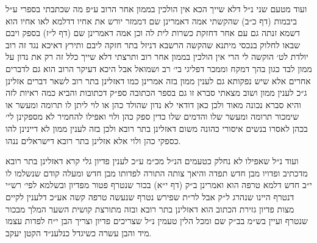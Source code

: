 \documentclass[12pt, openany]{book}
\begin{document}
\begin{multicols}{2}
ועוד מטעם שני נ״ל דלא שייך הכא אין הולכין בממון אחר הרוב ע״פ מה שכתבתי בספרי ע״ל ביבמות (דף כ״ב) שהקשתי אמה דאמרינן שם דממזר יורש את אחיו דדלמא לאו אחיו הוא דשמא זנתה גם עם אחר דחזקת כשרות לית לה וכן אמה דאמרינן שם (דף ל״ז) בספק ויבם שבאו לחלוק בנכסי מיתנא שהקשה הרשבא דניזל בתר חזקה ליבם ותירץ דאיכא נגד זה רוב יולדת לט׳ הוקשה לי הרי אין הולכין בממון אחר רוב ותרצתי דלא שייך כלל זה רק את נדון על ממון לבד כגון בהך דמקח וממכר דפליגי בי׳ רב ושמואל אבל היכא דעיקר הרוב הוא גם לדברים אחרים אלא שיש נפקותא גם לענין ממון בזה אמרינן כמו דאזלינן בתר רוב לשאר דברים אזלינן ג״כ לענין ממון ושוב מצאתי סברא זו גם בספר הכתובה ספ״ק דכתובות והביא כמה ראיות לזה והיא סברא נכונה מאוד ולכן כאן דודאי לא נדון שהולד כהן או לוי ליתן לו תרומה ומעשר או שימכור תרומה ומעשר שלו והדמים שלו כדין ספק כהן ולוי ואפילו להחמיר לא מספקינן לי׳ בכהן לאסרו בנשים איסורי כהונה משום דאזלינן בתר רובא ולכן בזה לענין ממון לא דיינינן להו כספקי כהן ולוי אלא אזלינן בתר רובא דישראלים ננהו.\\\vspace{0pt}

ועוד נ״ל שאפילו לא נחלק כטעמים הנ״ל מכ״מ ע״כ לענין פדיון גלי קרא דאזלינן בתר רובא מדכתיב ופדויו מבן חדש תפדה והיאך צותה התורה לפדותו מבן חדש ומעלה קודם שנשלמו לו י״ב חדש דלמא טרפה הוא ואמרינן ב״ק (דף י״א) בכור שנטרף פטור מפדיון ובשלמא לפי׳ רש״י דנטרף היינו שנהרג ל״ק אבל לר״ת שפירש נטרף שנעשה טרפה קשה אע״כ דלענין לקיים מצות פדיון גזירת הכתוב הוא דאזלינן בתר רובא ובזה מתורצת קושית השער המלך מבכור שנטרף ועיין בש״מ בב״ק שם ומכל הלין טעמין נ״ל שצריכים פדיון וצריך הבן י״ח לפדות עצמו מיד והבן עשרה כשיגדל כנלענ״ד הקטן יעקב.\\\vspace{0pt}

\end{multicols}\newpage
\end{document}
